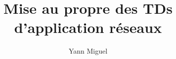 \documentclass[10pt, a4paper]{article}
\title{Mise au propre des TDs d'application r\'eseaux}
\author{Yann Miguel}
\begin{document}
\ttfamily
\maketitle
\tableofcontents
\newpage






\end{document}
